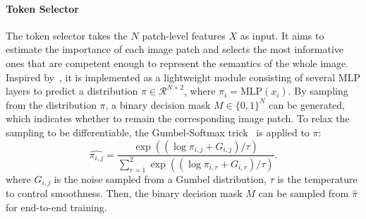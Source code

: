 \paragraph{Token Selector} The token selector takes the $N$ patch-level features $X$ as input. It aims to estimate the importance of each image patch and selects the most informative ones that are competent enough to represent the semantics of the whole image. Inspired by~\citep{rao2021dynamicvit}, it is implemented as a lightweight module consisting of several MLP layers to predict a distribution $\pi \in \mathcal{R}^{N\times2}$, where $\pi_{i}=\text{MLP}(x_i)$. By sampling from the distribution $\pi$, a binary decision mask $M \in \{0, 1\}^N$ can be generated, which indicates whether to remain the corresponding image patch. To relax the sampling to be differentiable, the Gumbel-Softmax trick~\citep{maddison2016gumbel} is applied to $\pi$:
\begin{equation}
    \hat{\pi_{i,j}} = \frac{\exp ((\log \pi_{i,j} + G_{i,j}) / \tau)}{\sum_{r=1}^{2} \exp ((\log\pi_{i,r} + G_{i,r}) / \tau) }.
\end{equation}
where $G_{i,j}$ is the noise sampled from a Gumbel distribution, $\tau$ is the temperature to control smoothness. Then, the binary decision mask $M$ can be sampled from $\hat{\pi}$ for end-to-end training. 

